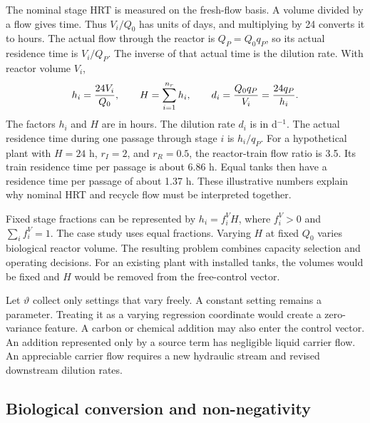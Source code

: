 The nominal stage HRT is measured on the fresh-flow basis. A volume divided by a flow gives time. Thus $V_i/Q_0$ has units of days, and multiplying by 24 converts it to hours. The actual flow through the reactor is $Q_P=Q_0q_P$, so its actual residence time is $V_i/Q_P$. The inverse of that actual time is the dilution rate. With reactor volume $V_i$,
\begin{equation}
\equationname{Stage retention times and recycle-adjusted dilution rates}
h_i=\frac{24V_i}{Q_0},\qquad H=\sum_{i=1}^{n_r}h_i,\qquad
d_i=\frac{Q_0q_P}{V_i}=\frac{24q_P}{h_i}.
\label{eq:plant_residence}
\end{equation}
The factors $h_i$ and $H$ are in hours. The dilution rate $d_i$ is in d$^{-1}$. The actual residence time during one passage through stage $i$ is $h_i/q_P$. For a hypothetical plant with $H=24$ h, $r_I=2$, and $r_R=0.5$, the reactor-train flow ratio is 3.5. Its train residence time per passage is about 6.86 h. Equal tanks then have a residence time per passage of about 1.37 h. These illustrative numbers explain why nominal HRT and recycle flow must be interpreted together.

Fixed stage fractions can be represented by $h_i=f_i^V H$, where $f_i^V>0$ and $\sum_i f_i^V=1$. The case study uses equal fractions. Varying $H$ at fixed $Q_0$ varies biological reactor volume. The resulting problem combines capacity selection and operating decisions. For an existing plant with installed tanks, the volumes would be fixed and $H$ would be removed from the free-control vector.

Let $\vartheta$ collect only settings that vary freely. A constant setting remains a parameter. Treating it as a varying regression coordinate would create a zero-variance feature. A carbon or chemical addition may also enter the control vector. An addition represented only by a source term has negligible liquid carrier flow. An appreciable carrier flow requires a new hydraulic stream and revised downstream dilution rates.

\subsection{Biological conversion and non-negativity}

